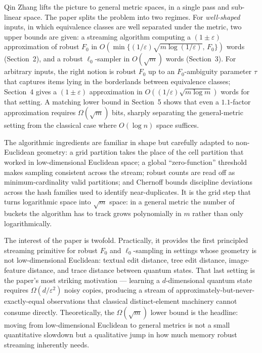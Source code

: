 \documentclass[11pt,a4paper]{article}
\begin{document}
Qin Zhang lifts the picture to general metric spaces, in a single pass and
sub-linear space. The paper splits the problem into two regimes. For
\emph{well-shaped} inputs, in which equivalence classes are well separated
under the metric, two upper bounds are given: a streaming algorithm
computing a $(1\pm\varepsilon)$ approximation of robust $F_0$ in
$O\!\left(\min\{(1/\varepsilon)\sqrt{m\log(1/\varepsilon)},\,F_0\}\right)$
words (Section~2), and a robust $\ell_0$-sampler in $O(\sqrt{m})$ words
(Section~3). For arbitrary inputs, the right notion is robust $F_0$ up to
an $F_0$-ambiguity parameter $\tau$ that captures items lying in the
borderlands between equivalence classes; Section~4 gives a
$(1\pm\varepsilon)$ approximation in $O((1/\varepsilon)\sqrt{m\log m})$
words for that setting. A matching lower bound in Section~5 shows that
even a $1.1$-factor approximation requires $\Omega(\sqrt{m})$ bits,
sharply separating the general-metric setting from the classical case
where $O(\log n)$ space suffices.

The algorithmic ingredients are familiar in shape but carefully adapted to
non-Euclidean geometry: a grid partition takes the place of the cell
partition that worked in low-dimensional Euclidean space; a global
``zero-function'' threshold makes sampling consistent across the stream;
robust counts are read off as minimum-cardinality valid partitions; and
Chernoff bounds discipline deviations across the hash families used to
identify near-duplicates. It is the grid step that turns logarithmic space
into $\sqrt{m}$ space: in a general metric the number of buckets the
algorithm has to track grows polynomially in $m$ rather than only
logarithmically.

The interest of the paper is twofold. Practically, it provides the first
principled streaming primitive for robust $F_0$ and $\ell_0$-sampling in
settings whose geometry is not low-dimensional Euclidean: textual edit
distance, tree edit distance, image-feature distance, and trace distance
between quantum states. That last setting is the paper's most striking
motivation --- learning a $d$-dimensional quantum state requires
$\Omega(d/\varepsilon^2)$ noisy copies, producing a stream of
approximately-but-never-exactly-equal observations that classical
distinct-element machinery cannot consume directly. Theoretically, the
$\Omega(\sqrt{m})$ lower bound is the headline: moving from low-dimensional
Euclidean to general metrics is not a small quantitative slowdown but a
qualitative jump in how much memory robust streaming inherently needs.
\end{document}
